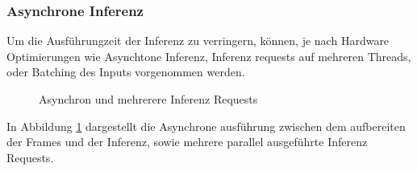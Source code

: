 \subsubsection{Asynchrone Inferenz}


Um die Ausführungzeit der Inferenz zu verringern, können, 
je nach Hardware Optimierungen wie Asynchtone Inferenz, 
Inferenz requests auf mehreren Threads, oder Batching des 
Inputs vorgenommen werden.

\begin{figure}[htb]
    \centering
    \def\svgwidth{0.7\textwidth}
    
    \caption{Asynchron und mehrerere Inferenz Requests}
    \label{fig:async}
\end{figure}

In Abbildung \ref{fig:async} dargestellt die Asynchrone ausführung 
zwischen dem aufbereiten der Frames und der Inferenz, sowie 
mehrere parallel ausgeführte Inferenz Requests.

